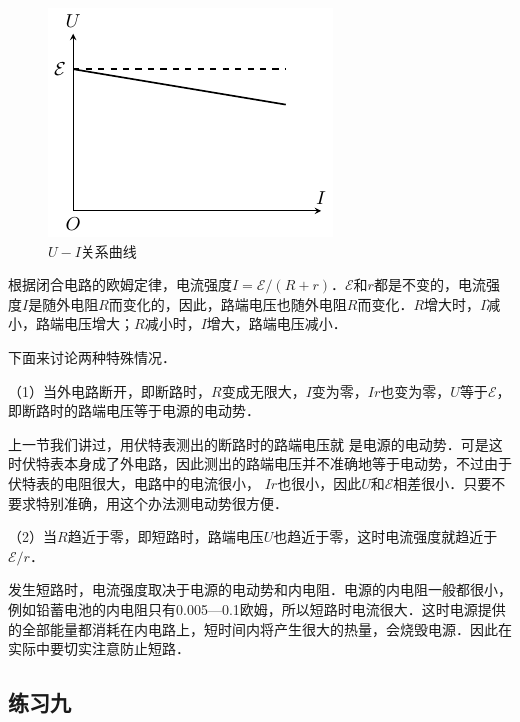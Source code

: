 \begin{figure}[htbp]
	\centering
	\includegraphics{fig/B/7-31.pdf}
	\caption{$U-I$关系曲线}\label{fig_B_7-31}
\end{figure}



根据闭合电路的欧姆定律，电流强度$I=\mathcal{E}/(R+r)$．$\mathcal{E}$和$r$都是不变的，电流强度$I$是随外电阻$R$而变化的，因此，路端电压也随外电阻$R$而变化．$R$增大时，$I$减小，路端电压增大；$R$减小时，$I$增大，路端电压减小．

下面来讨论两种特殊情况．

（1）当外电路断开，即断路时，$R$变成无限大，$I$变为零，$Ir$也变为零，$U$等于$\mathcal{E}$，即断路时的路端电压等于电源的电动势．

上一节我们讲过，用伏特表测出的断路时的路端电压就
是电源的电动势．可是这时伏特表本身成了外电路，因此测出的路端电压并不准确地等于电动势，不过由于伏特表的电阻很大，电路中的电流很小，
$Ir$也很小，因此$U$和$\mathcal{E}$相差很小．只要不要求特别准确，用这个办法测电动势很方便．

（2）当$R$趋近于零，即短路时，路端电压$U$也趋近于零，这时电流强度就趋近于$\mathcal{E}/r$．

发生短路时，电流强度取决于电源的电动势和内电阻．电源的内电阻一般都很小，例如铅蓄电池的内电阻只有0.005—0.1欧姆，所以短路时电流很大．这时电源提供的全部能量都消耗在内电路上，短时间内将产生很大的热量，会烧毁电源．因此在实际中要切实注意防止短路．

\subsection*{练习九}


